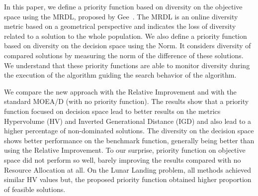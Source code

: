 In this paper, we define a priority function based on diversity on the objective space using the MRDL, proposed by Gee~\cite{gee2015online}. The MRDL is an online diversity metric based on a geometrical perspective and indicates the loss of diversity related to a solution to the whole population. We also define a priority function based on diversity on the decision space using the Norm. It considers diversity of compared solutions by measuring the norm of  the difference of these solutions. We understand that these priority functions are able to monitor diversity during the execution of the algorithm guiding the search behavior of the algorithm.


We compare the new approach with the Relative Improvement and with the standard MOEA/D (with no priority function). The results show that a priority function focused on decision space lead to better results on the metrics Hypervolume (HV) and Inverted Generational Distance (IGD) and also lead to a higher percentage of non-dominated solutions. The diversity on the decision space shows better performance on the benchmark function,  generally being better than using the Relative Improvement. To our surprise, priority function on objective space did not perform so well, barely improving the results compared with no Resource Allocation at all. On the Lunar Landing problem, all methods achieved similar HV values but, the proposed priority function obtained higher proportion of feasible solutions.




